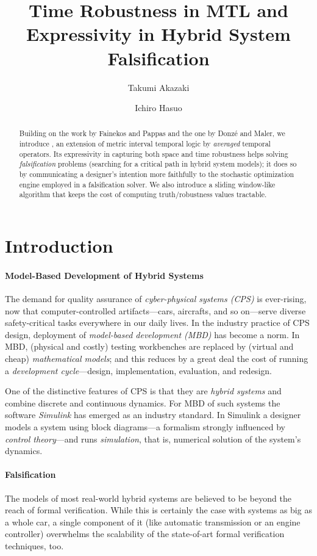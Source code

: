 \documentclass[envcountsect,orivec]{llncs} \usepackage{etex} \usepackage[]{graphicx}
\title{
Time Robustness in MTL and
\\Expressivity in
  Hybrid System Falsification
}
\author{
Takumi Akazaki
 \inst{1,2}
\and
Ichiro Hasuo
\inst{1}
 }
\institute{
The University of Tokyo, Japan
    \and
    JSPS Research Fellow
}
\begin{document}
\maketitle


\begin{abstract}
  Building on the work by Fainekos and Pappas and the one by Donz\'{e}
  and Maler, we introduce , an extension of metric interval
  temporal logic by \emph{averaged} temporal operators.  Its
  expressivity in capturing both space and time robustness helps solving
  \emph{falsification} problems (searching for a critical path in
  hybrid system models); it does so by communicating a designer's intention more
  faithfully to the stochastic optimization engine employed in a
  falsification solver.  We also introduce a sliding window-like
  algorithm that keeps the cost of computing truth/robustness values tractable.
   


\end{abstract}


\section{Introduction}\label{sec:introduction}
\paragraph{Model-Based Development of Hybrid Systems}
The demand for quality assurance of \emph{cyber-physical systems (CPS)} is
ever-rising, now that computer-controlled artifacts---cars, aircrafts,
and so on---serve diverse safety-critical tasks 
everywhere in our daily lives.  In the industry practice of CPS design, deployment
of \emph{model-based development (MBD)} has become a norm. 
In MBD, (physical and costly) testing workbenches are replaced 
by (virtual and cheap) \emph{mathematical models}; 
and this reduces by a great deal the cost of running 
a \emph{development cycle}---design, implementation, evaluation, and redesign.

One of the distinctive features of CPS is that they are \emph{hybrid systems} 
and combine discrete and continuous
dynamics. For MBD of such systems the software \emph{Simulink} has emerged as an
industry standard. In Simulink a designer models a system using block
diagrams---a formalism  strongly influenced by \emph{control theory}---and 
runs \emph{simulation}, that is, numerical solution of the system's dynamics.


\paragraph{Falsification}
The models of most real-world hybrid systems are believed to be beyond
the reach of formal verification.  While this is certainly the case with 
systems as big as a whole car,
a single component of it (like automatic transmission or an engine
controller)  overwhelms the scalability of
the state-of-art formal verification techniques, too.
\end{document}
